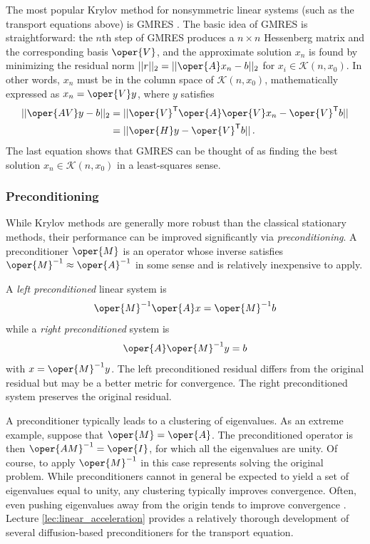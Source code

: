 The most popular Krylov method for nonsymmetric linear systems (such as the 
transport equations above) is GMRES \cite{saad1986gmr}.  The basic idea 
of GMRES is straightforward:  the $n$th step of GMRES produces a 
$n\times n$ Hessenberg matrix and the corresponding basis $\oper{V}$,
and the approximate solution $x_n$ is found by minimizing the residual 
norm $||r||_2 = ||\oper{A}x_n-b||_2$
for $x_i \in \mathcal{K}(n, x_0)$.  In other words, $x_n$ must be in 
the column space of $\mathcal{K}(n, x_0)$, mathematically 
expressed as $x_n = \oper{V} y$,  where 
$y$ satisfies 
\begin{equation}
\begin{split}
  ||\oper{AV}y-b||_2 &= ||\oper{V}^{\transp} \oper{A} \oper{V} x_n -\oper{V}^{\transp} b|| \\
                     &= || \oper{H} y - \oper{V}^{\transp} b || \, .
\end{split}
\end{equation}
The last equation shows that GMRES can be thought of as finding the 
best solution $x_n \in \mathcal{K}(n, x_0)$ in a least-squares sense.

\subsubsection{Preconditioning}

While Krylov methods are generally more robust than the classical 
stationary methods, their performance can be improved significantly
via \emph{preconditioning}.  A preconditioner $\oper{M}$ is an operator 
whose inverse satisfies $\oper{M}^{-1} \approx \oper{A}^{-1}$ in some sense 
and is relatively inexpensive to apply.

A \emph{left preconditioned} linear system is
\begin{equation}
  \oper{M}^{-1}\oper{A}x = \oper{M}^{-1}b
\end{equation}
while a \emph{right preconditioned} system is 
\begin{equation}
  \oper{A}\oper{M}^{-1} y = b
\end{equation}
with $x = \oper{M}^{-1} y$.  The left preconditioned residual differs 
from the original residual but may be a better metric for convergence. 
The right preconditioned system preserves the original residual.  

A preconditioner typically leads to a clustering of eigenvalues.  As 
an extreme example, suppose that $\oper{M} = \oper{A}$.  The 
preconditioned operator is then $\oper{AM}^{-1} = \oper{I}$, for 
which all the eigenvalues are unity.  Of course, to apply $\oper{M}^{-1}$ 
in this case represents solving the original problem.  While preconditioners
cannot in general be expected to yield a set of eigenvalues equal to unity, 
any clustering typically improves convergence.  Often, even pushing 
eigenvalues away from the origin tends to improve 
convergence \cite{larsen2010ado}.
Lecture \ref{lec:linear_acceleration} provides a relatively thorough
development of several diffusion-based preconditioners for the 
transport equation.

